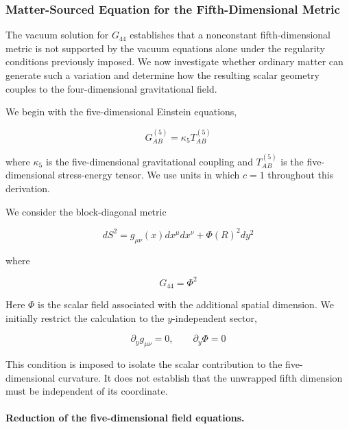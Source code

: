 \documentclass[pdflatex,sn-mathphys-num]{sn-jnl}%
\theoremstyle{thmstyleone}%
\theoremstyle{thmstyletwo}%
\theoremstyle{thmstylethree}%
\begin{document}
\subsubsection{Matter-Sourced Equation for the Fifth-Dimensional Metric}

The vacuum solution for $G_{44}$ establishes that a nonconstant fifth-dimensional metric is not supported by the vacuum equations alone under the regularity conditions previously imposed. We now investigate whether ordinary matter can generate such a variation and determine how the resulting scalar geometry couples to the four-dimensional gravitational field.

We begin with the five-dimensional Einstein equations,

\begin{equation}
    \boxed{
    G_{AB}^{(5)}=\kappa_5 T_{AB}^{(5)}
    }
    \label{eq_5d_sourced_einstein}
\end{equation}

where $\kappa_5$ is the five-dimensional gravitational coupling and $T_{AB}^{(5)}$ is the five-dimensional stress-energy tensor. We use units in which $c=1$ throughout this derivation.

We consider the block-diagonal metric

\begin{equation}
    \boxed{
    dS^2
    =
    g_{\mu\nu}(x)dx^\mu dx^\nu
    +
    \Phi(R)^2dy^2
    }
    \label{eq_scalar_metric_ansatz}
\end{equation}

where

\begin{equation}
    G_{44}=\Phi^2
\end{equation}

Here $\Phi$ is the scalar field associated with the additional spatial dimension. We initially restrict the calculation to the $y$-independent sector,

\begin{equation}
    \partial_y g_{\mu\nu}=0,
    \qquad
    \partial_y\Phi=0
    \label{eq_cylinder_condition_scalar}
\end{equation}

This condition is imposed to isolate the scalar contribution to the five-dimensional curvature. It does not establish that the unwrapped fifth dimension must be independent of its coordinate.

\paragraph{Reduction of the five-dimensional field equations.}
\end{document}
